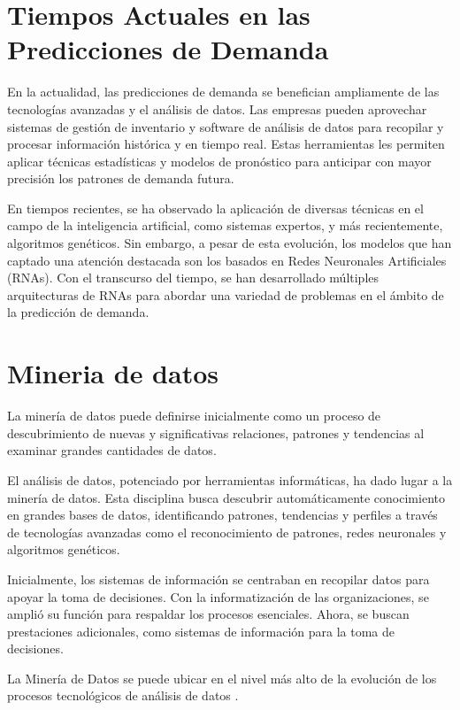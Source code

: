 \section{Tiempos Actuales en las Predicciones de Demanda}

En la actualidad, las predicciones de demanda se benefician ampliamente de las tecnologías avanzadas y el análisis de datos. Las empresas pueden aprovechar sistemas de gestión de inventario y software de análisis de datos para recopilar y procesar información histórica y en tiempo real. Estas herramientas les permiten aplicar técnicas estadísticas y modelos de pronóstico para anticipar con mayor precisión los patrones de demanda futura.

En tiempos recientes, se ha observado la aplicación de diversas técnicas en el campo de la inteligencia artificial, como sistemas expertos, y más recientemente, algoritmos genéticos. Sin embargo, a pesar de esta evolución, los modelos que han captado una atención destacada son los basados en Redes Neuronales Artificiales (RNAs). Con el transcurso del tiempo, se han desarrollado múltiples arquitecturas de RNAs para abordar una variedad de problemas en el ámbito de la predicción de demanda.

\section{Mineria de datos}
La minería de datos puede definirse inicialmente como un proceso de descubrimiento de nuevas y significativas relaciones, patrones y tendencias al examinar grandes cantidades de datos\cite{perez2007mineria}.

El análisis de datos, potenciado por herramientas informáticas, ha dado lugar a la minería de datos. Esta disciplina busca descubrir automáticamente conocimiento en grandes bases de datos, identificando patrones, tendencias y perfiles a través de tecnologías avanzadas como el reconocimiento de patrones, redes neuronales y algoritmos genéticos.

Inicialmente, los sistemas de información se centraban en recopilar datos para apoyar la toma de decisiones. Con la informatización de las organizaciones, se amplió su función para respaldar los procesos esenciales. Ahora, se buscan prestaciones adicionales, como sistemas de información para la toma de decisiones.

La Minería de Datos se puede ubicar en el nivel más alto de la evolución de los procesos tecnológicos de análisis de datos \cite{martinez2001mineria}.

